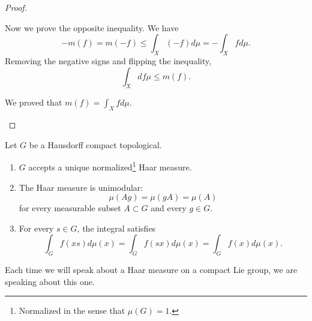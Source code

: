 \begin{proof}
\begin{subproof}
		Now we prove the opposite inequality. We have
		\begin{equation}
			-m(f)=m(-f)\leq \int_X(-f)d\mu=-\int_Xfd\mu.
		\end{equation}
		Removing the negative signs and flipping the inequality,
		\begin{equation}
			\int_Xdf\mu\leq m(f).
		\end{equation}

		We proved that \( m(f)=\int_Xfd\mu\).
	\end{subproof}
\end{proof}

\begin{theorem} \label{ThoBZBooOTxqcI}
	Let \( G\) be a Hausdorff compact topological.
	\begin{enumerate}
		\item       \label{ITEMooVFCCooXevpMx}
		      \( G\) accepts a unique normalized\footnote{Normalized in the sense that \( \mu(G)=1\).} Haar measure.
		\item       \label{ITEMooWDIHooHEkcDz}
		      The Haar measure is unimodular:
		      \begin{equation}
			      \mu(Ag)=\mu(gA)=\mu(A)
		      \end{equation}
		      for every measurable subset \( A\subset G\) and every \( g\in G\).
		\item       \label{ITEMooJQMBooCsSWws}
		      For every \( s\in G\), the integral satisfies
		      \begin{equation}        \label{EQooGHNFooZMEeoh}
			      \int_Gf(xs)d\mu(x)=\int_Gf(sx)d\mu(x)=\int_Gf(x)d\mu(x).
		      \end{equation}
	\end{enumerate}

	Each time we will speak about a Haar measure on a compact Lie group, we are speaking about this one.
\end{theorem}

